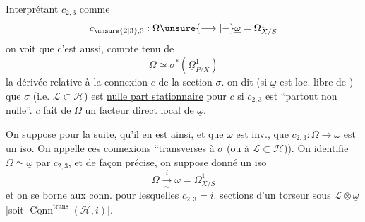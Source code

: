 Interprétant $c_{2,3}$ comme
\[
c_{\unsure{2|3},3}:\Omega\unsure{\longrightarrow|\mathbin{-}}\underline{\omega}=\Omega^1_{X/S}
\]
on voit que c'est aussi, compte tenu de
\[
\Omega\simeq\sigma^*(\underline{\Omega}^1_{P/X})
\]
la dérivée relative à la connexion $c$ de la section $\sigma$. on dit (si $\underline{\omega}$ est loc. libre de ) que $\sigma$ (i.e. $\mathcal{L}\subset\mathcal{H}$) est \uline{nulle part stationnaire} pour $c$ si $c_{2,3}$ est ``partout non nulle''.   $c$ fait de $\Omega$ un facteur direct local de $\underline{\omega}$.

On suppose pour la suite, qu'il en est ainsi, \uline{et} que $\omega$ est inv.,  que $c_{2,3}:\Omega\longrightarrow\underline{\omega}$ est un iso. On appelle ces connexions ``\uline{transverses} à $\sigma$ (ou à $\mathcal{L}\subset\mathcal{H}$)). On identifie $\Omega\simeq\underline{\omega}$ par $c_{2,3}$, et de façon précise, on suppose donné un iso
\[
\Omega\xrightarrow[\sim]{i}\underline{\omega}=\Omega^1_{X/S}
\]
et on se borne aux conn. pour lesquelles $c_{2,3}=i$.   sections d'un torseur sous $\mathcal{L}\otimes\underline{\omega}$ [soit $\underline{\operatorname{Conn}}^{\mathrm{trans}}(\mathcal{H},i)$].

